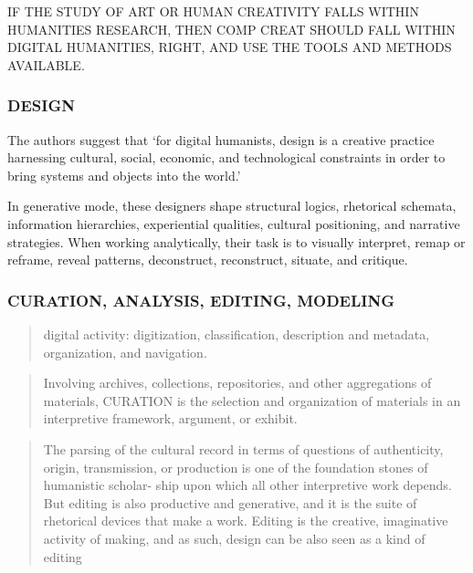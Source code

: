 \begin{draft}
  \begin{draft}
    IF THE STUDY OF ART OR HUMAN CREATIVITY FALLS WITHIN HUMANITIES RESEARCH, THEN COMP CREAT SHOULD FALL WITHIN DIGITAL HUMANITIES, RIGHT, AND USE THE TOOLS AND METHODS AVAILABLE.\@
  \end{draft}

  \subsubsection*{DESIGN}
  The authors suggest that `for digital humanists, design is a creative practice harnessing cultural, social, economic, and technological constraints in order to bring systems and objects into the world.' \autocite[p.13]{Burdick2012}

  In generative mode, these designers shape structural logics, rhetorical schemata, information hierarchies, experiential qualities, cultural positioning, and narrative strategies. When working analytically, their task is to visually interpret, remap or reframe, reveal patterns, deconstruct, reconstruct, situate, and critique. \autocite[p.12]{Burdick2012}

  \subsubsection*{CURATION, ANALYSIS, EDITING, MODELING}
  \begin{quote}
    digital activity: digitization, classification, description and metadata, organization, and navigation. \autocite[p.17]{Burdick2012}
  \end{quote}

  \begin{quote}
    Involving archives, collections, repositories, and other aggregations of materials, CURATION is the selection and organization of materials in an interpretive framework, argument, or exhibit. \autocite[p.17]{Burdick2012}
  \end{quote}

  \begin{quote}
    The parsing of the cultural record in terms of questions of authenticity, origin, transmission, or production is one of the foundation stones of humanistic scholar- ship upon which all other interpretive work depends. But editing is also productive and generative, and it is the suite of rhetorical devices that make a work. Editing is the creative, imaginative activity of making, and as such, design can be also seen as a kind of editing \autocite[p.18]{Burdick2012}
  \end{quote}


\end{draft}
